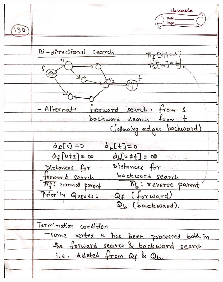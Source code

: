 \begin{figure}[H]
    \centering
    \includegraphics[scale=0.25]{"./MIT 6.006/MIT_6006_130"}
\end{figure}
\newpage
